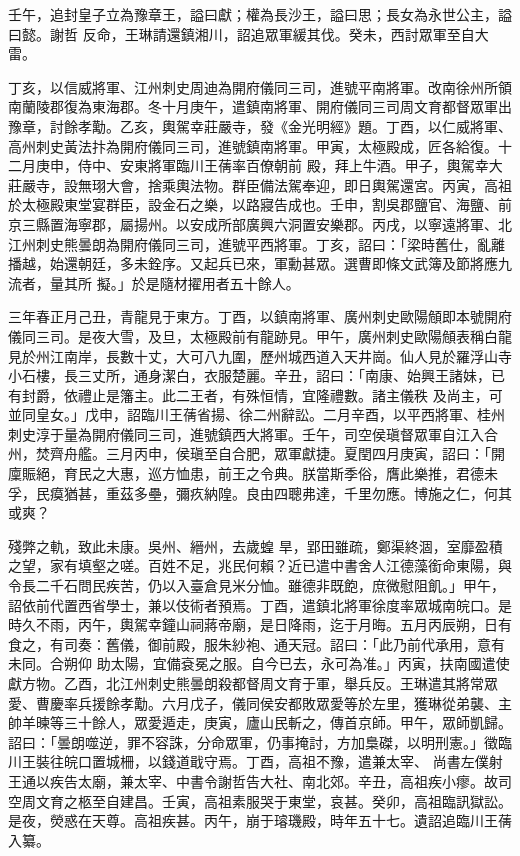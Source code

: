 \begin{pinyinscope}
 壬午，追封皇子立為豫章王，謚曰獻；權為長沙王，謚曰思；長女為永世公主，謚曰懿。謝哲
 反命，王琳請還鎮湘川，詔追眾軍緩其伐。癸未，西討眾軍至自大雷。



 丁亥，以信威將軍、江州刺史周迪為開府儀同三司，進號平南將軍。改南徐州所領南蘭陵郡復為東海郡。冬十月庚午，遣鎮南將軍、開府儀同三司周文育都督眾軍出豫章，討餘孝勱。乙亥，輿駕幸莊嚴寺，發《金光明經》題。丁酉，以仁威將軍、高州刺史黃法抃為開府儀同三司，進號鎮南將軍。甲寅，太極殿成，匠各給復。十二月庚申，侍中、安東將軍臨川王蒨率百僚朝前
 殿，拜上牛酒。甲子，輿駕幸大莊嚴寺，設無珝大會，捨乘輿法物。群臣備法駕奉迎，即日輿駕還宮。丙寅，高祖於太極殿東堂宴群臣，設金石之樂，以路寢告成也。壬申，割吳郡鹽官、海鹽、前京三縣置海寧郡，屬揚州。以安成所部廣興六洞置安樂郡。丙戌，以寧遠將軍、北江州刺史熊曇朗為開府儀同三司，進號平西將軍。丁亥，詔曰：「梁時舊仕，亂離播越，始還朝廷，多未銓序。又起兵已來，軍勳甚眾。選曹即條文武簿及節將應九流者，量其所
 擬。」於是隨材擢用者五十餘人。



 三年春正月己丑，青龍見于東方。丁酉，以鎮南將軍、廣州刺史歐陽頠即本號開府儀同三司。是夜大雪，及旦，太極殿前有龍跡見。甲午，廣州刺史歐陽頠表稱白龍見於州江南岸，長數十丈，大可八九圍，歷州城西道入天井崗。仙人見於羅浮山寺小石樓，長三丈所，通身潔白，衣服楚麗。辛丑，詔曰：「南康、始興王諸妹，已有封爵，依禮止是籓主。此二王者，有殊恒情，宜隆禮數。諸主儀秩
 及尚主，可並同皇女。」戊申，詔臨川王蒨省揚、徐二州辭訟。二月辛酉，以平西將軍、桂州刺史淳于量為開府儀同三司，進號鎮西大將軍。壬午，司空侯瑱督眾軍自江入合州，焚齊舟艦。三月丙申，侯瑱至自合肥，眾軍獻捷。夏閏四月庚寅，詔曰：「開廩賑絕，育民之大惠，巡方恤患，前王之令典。朕當斯季俗，膺此樂推，君德未孚，民瘼猶甚，重茲多壘，彌疚納隍。良由四聰弗達，千里勿應。博施之仁，何其或爽？



 殘弊之軌，致此未康。吳州、縉州，去歲蝗
 旱，郢田雖疏，鄭渠終涸，室靡盈積之望，家有填壑之嗟。百姓不足，兆民何賴？近已遣中書舍人江德藻銜命東陽，與令長二千石問民疾苦，仍以入臺倉見米分恤。雖德非既飽，庶微慰阻飢。」甲午，詔依前代置西省學士，兼以伎術者預焉。丁酉，遣鎮北將軍徐度率眾城南皖口。是時久不雨，丙午，輿駕幸鐘山祠蔣帝廟，是日降雨，迄于月晦。五月丙辰朔，日有食之，有司奏：舊儀，御前殿，服朱紗袍、通天冠。詔曰：「此乃前代承用，意有未同。合朔仰
 助太陽，宜備袞冕之服。自今已去，永可為准。」丙寅，扶南國遣使獻方物。乙酉，北江州刺史熊曇朗殺都督周文育于軍，舉兵反。王琳遣其將常眾愛、曹慶率兵援餘孝勱。六月戊子，儀同侯安都敗眾愛等於左里，獲琳從弟襲、主帥羊暕等三十餘人，眾愛遁走，庚寅，廬山民斬之，傳首京師。甲午，眾師凱歸。詔曰：「曇朗噬逆，罪不容誅，分命眾軍，仍事掩討，方加梟磔，以明刑憲。」徵臨川王裝往皖口置城柵，以錢道戢守焉。丁酉，高祖不豫，遣兼太宰、
 尚書左僕射王通以疾告太廟，兼太宰、中書令謝哲告大社、南北郊。辛丑，高祖疾小瘳。故司空周文育之柩至自建昌。壬寅，高祖素服哭于東堂，哀甚。癸卯，高祖臨訊獄訟。是夜，熒惑在天尊。高祖疾甚。丙午，崩于璿璣殿，時年五十七。遺詔追臨川王蒨入纂。




\end{pinyinscope}
